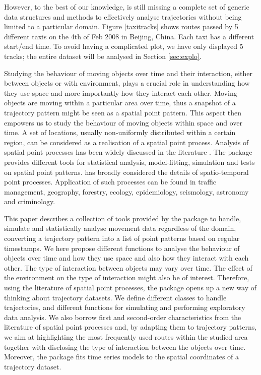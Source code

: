 \documentclass[article]{jss}
\begin{document}
However, to the best of our knowledge,  is still missing a complete set of generic data structures and methods to effectively analyse trajectories without being limited to a particular domain. Figure \ref{taxitracks} shows routes passed by 5 different taxis on the 4th of Feb 2008 in Beijing, China. Each taxi has a different start/end time.
To avoid having a complicated plot, we have only displayed 5 tracks; the entire dataset will be analysed in Section \ref{sec:explo}.

Studying the behaviour of moving objects over time and their interaction, either between objects or with environment, plays a crucial role in understanding how they use space and more importantly how they interact each other. Moving objects are moving within a particular area over time, thus a snapshot of a trajectory pattern might be seen as a spatial point pattern. This aspect then empowers us to study the behaviour of moving objects within space and over time. A set of locations, usually non-uniformly distributed within a certain region, can be considered as a realisation of a spatial point process. Analysis of spatial point processes has been widely discussed in the literature \citep{MW03,IPSS08,D13,BRT15}. The  package  \citep{baddeley05,BRT15} provides different tools for statistical analysis, model-fitting, simulation and tests on spatial point patterns. \cite{D13} has broadly considered the details of spatio-temporal point processes. Application of such processes can be found in traffic management, geography, forestry, ecology, epidemiology, seismology, astronomy and criminology. 

This paper describes a collection of tools provided by the  package  to handle, simulate and statistically analyse movement data regardless of the domain, converting a trajectory pattern into a list of point patterns based on regular timestamps. We here propose different functions to analyse the behaviour of objects over time and how they use space and also how they interact with each other. The type of interaction between objects may vary over time. The effect of the environment on the type of interaction might also be of interest. Therefore, using the literature of spatial point processes, the  package  opens up a new way of thinking about trajectory datasets. We define different classes to handle trajectories, and different functions for simulating and performing exploratory data analysis. We also borrow first and second-order characteristics from the literature of spatial point processes and, by adapting them to trajectory patterns, we aim at highlighting the most frequently used routes within the studied area together with disclosing the type of interaction between the objects over time. Moreover, the  package fits time series models to the spatial coordinates of a trajectory dataset.
\end{document}
